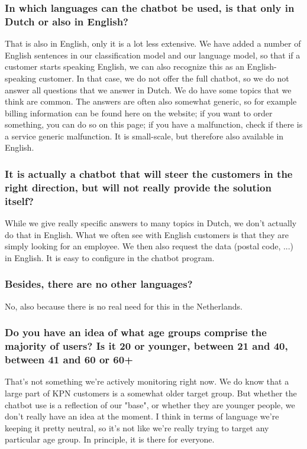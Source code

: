 \begin{appendices}
	\subsubsection{In which languages can the chatbot be used, is that only in Dutch or also in English?}
	That is also in English, only it is a lot less extensive. We have added a number of English sentences in our classification model and our language model, so that if a customer starts speaking English, we can also recognize this as an English-speaking customer. In that case, we do not offer the full chatbot, so we do not answer all questions that we answer in Dutch. We do have some topics that we think are common. The answers are often also somewhat generic, so for example billing information can be found here on the website; if you want to order something, you can do so on this page; if you have a malfunction, check if there is a service generic malfunction. It is small-scale, but therefore also available in English.
	
	\subsubsection{It is actually a chatbot that will steer the customers in the right direction, but will not really provide the solution itself?}
	While we give really specific answers to many topics in Dutch, we don't actually do that in English. What we often see with English customers is that they are simply looking for an employee. We then also request the data (postal code, ...) in English. It is easy to configure in the chatbot program.
	
	\subsubsection{Besides, there are no other languages?}
	No, also because there is no real need for this in the Netherlands.
	
	\subsubsection{Do you have an idea of what age groups comprise the majority of users? Is
		it 20 or younger, between 21 and 40, between 41 and 60 or 60+}
	That's not something we're actively monitoring right now. We do know that a large part of KPN customers is a somewhat older target group. But whether the chatbot use is a reflection of our "base", or whether they are younger people, we don't really have an idea at the moment. I think in terms of language we're keeping it pretty neutral, so it's not like we're really trying to target any particular age group. In principle, it is there for everyone.
	

\end{appendices}
